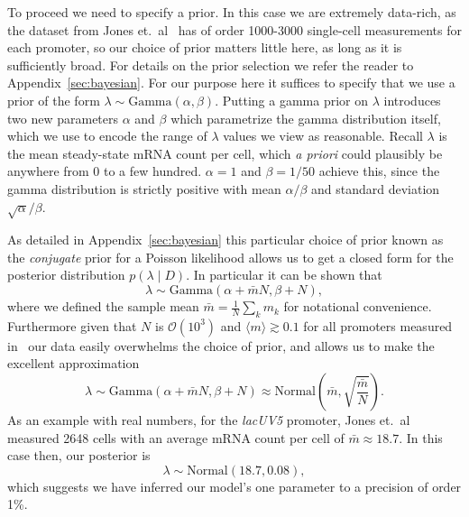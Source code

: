 To proceed we need to specify a prior. In this case we are extremely data-rich,
as the dataset from Jones et.\ al~\cite{Jones2014} has of order 1000-3000
single-cell measurements for each promoter, so our choice of prior matters
little here, as long as it is sufficiently broad. For details on the prior 
selection we refer the reader to Appendix~\ref{sec:bayesian}. For our
purpose here it suffices to specify that we use a prior of the form $\lambda
\sim \text{Gamma}(\alpha, \beta)$. Putting a gamma prior on $\lambda$ introduces
two new parameters $\alpha$ and $\beta$ which parametrize the gamma distribution
itself, which we use to encode the range of $\lambda$ values we view as
reasonable. Recall $\lambda$ is the mean steady-state mRNA count per cell, which
\textit{a priori} could plausibly be anywhere from 0 to a few hundred.
$\alpha=1$ and $\beta=1/50$ achieve this, since the gamma distribution is
strictly positive with mean $\alpha/\beta$ and standard deviation
$\sqrt{\alpha}/\beta$.

As detailed in Appendix~\ref{sec:bayesian} this particular choice of prior
known as the \textit{conjugate} prior for a Poisson likelihood allows us to 
get a closed form for the posterior distribution $p(\lambda \mid D)$. In 
particular it can be shown that~\cite{Gelman2013}
\begin{equation}
\lambda
\sim \text{Gamma}\left(\alpha + \bar{m}N, \beta + N\right),
\end{equation}
where we defined the sample mean $\bar{m} = \frac{1}{N}\sum_k m_k$ for
notational convenience. Furthermore given that $N$ is $\mathcal{O}(10^3)$ and
$\langle m\rangle \gtrsim 0.1$ for all promoters measured in~\cite{Jones2014}
our data easily overwhelms the choice of prior, and allows us to make the 
excellent approximation 
\begin{equation}
\lambda
\sim \text{Gamma}\left(\alpha + \bar{m}N, \beta + N\right)
\approx \text{Normal}\left(\bar{m}, \sqrt{\frac{\bar{m}}{N}}\right).
\end{equation}
As an example with real numbers, for the \textit{lacUV5} promoter, Jones et.\
al~\cite{Jones2014} measured 2648 cells with an average mRNA count per cell of
$\bar{m} \approx 18.7$. In this case then, our posterior is
\begin{equation}
\lambda
\sim \text{Normal}\left(18.7, 0.08\right),
\label{eq:posterior_poisson}
\end{equation}
which suggests we have inferred our model's one parameter to a precision of
order 1\%.

